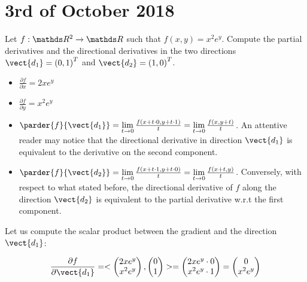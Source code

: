 \documentclass[computationalMathematics.tex]{subfiles}
\begin{document}
\chapter{3rd of October 2018}
\begin{example}[On derivatives]
Let $f:\R^2 \to \R$ such that $f(x, y) = x^2 e^y$.
Compute the partial derivatives and the directional derivatives in the two directions $\vect{d_1} = \tr{(0,1)}$ and $\vect{d_2} = \tr{(1,0)}$.

\begin{itemize}
	\item $\frac{\partial f}{\partial x} = 2x e^y $
	\item $\frac{\partial f}{\partial y} = x^2 e^y $
	\item $\parder{f}{\vect{d_1}} = \lim\limits_{t \to 0} \frac{f(x + t \cdot 0, y + t \cdot 1)}{t} =  \lim\limits_{t \to 0} \frac{f(x, y+ t)}{t}$.
	An attentive reader may notice that the directional derivative in direction $\vect{d_1}$ is equivalent to the derivative on the second component.
	\item $\parder{f}{\vect{d_2}} = \lim\limits_{t \to 0} \frac{f(x + t \cdot 1, y + t \cdot 0)}{t} =  \lim\limits_{t \to 0} \frac{f(x + t, y)}{t}$. Conversely, with respect to what stated before, the directional derivative of $f$ along the direction $\vect{d_2}$ is equivalent to the partial derivative w.r.t the first component.
\end{itemize}

Let us compute the scalar product between the gradient and the direction $\vect{d_1}$:

\[
\frac{\partial f}{\partial \vect{d_1}} = \ps{\begin{pmatrix}2x e^y\\ x^2 e^y\end{pmatrix}}{\begin{pmatrix} 0\\ 1 \end{pmatrix}} =  \begin{pmatrix}
2x e^y \cdot 0\\ x^2 e^y \cdot 1 \end{pmatrix} = \begin{pmatrix}
0\\ x^2 e^y \end{pmatrix}
\]

\end{example}
\end{document}
